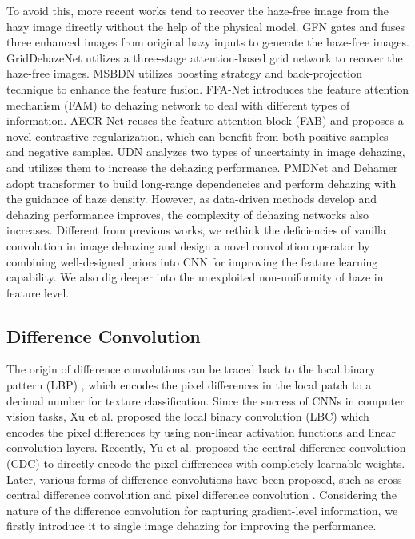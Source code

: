 \documentclass[lettersize,journal]{IEEEtran}
\begin{document}
{To avoid this, more recent works tend to recover the haze-free image from the hazy image directly without the help of the physical model. 
GFN \cite{ren2018CVPR} gates and fuses three enhanced images from original hazy inputs to generate the haze-free images. 
GridDehazeNet \cite{liu2019ICCV} utilizes a three-stage attention-based grid network to recover the haze-free images. 
MSBDN \cite{dong2020CVPR} utilizes boosting strategy and back-projection technique to enhance the feature fusion. 
FFA-Net \cite{qin2020AAAI} introduces the feature attention mechanism (FAM) to dehazing network to deal with different types of information. 
AECR-Net \cite{wu2021CVPR} reuses the feature attention block (FAB) \cite{qin2020AAAI} and proposes a novel contrastive regularization, which can benefit from both positive samples and negative samples. 
UDN \cite {hong2022AAAI} analyzes two types of uncertainty in image dehazing, and utilizes them to increase the dehazing performance. 
PMDNet \cite{ye2022ECCVORAL} and Dehamer \cite{guo2022CVPR} adopt transformer to build long-range dependencies and perform dehazing with the guidance of haze density. 
However, as data-driven methods develop and dehazing performance improves, the complexity of dehazing networks also increases. 
Different from previous works, we rethink the deficiencies of vanilla convolution in image dehazing and design a novel convolution operator by combining well-designed priors into CNN for improving the feature learning capability. 
We also dig deeper into the unexploited non-uniformity of haze in feature level. 


\subsection{Difference Convolution}
The origin of difference convolutions can be traced back to the local binary pattern (LBP) \cite{ojala2002TPAMI}, which encodes the pixel differences in the local patch to a decimal number for texture classification. 
Since the success of CNNs in computer vision tasks, Xu et al. \cite{juefei2017CVPR} proposed the local binary convolution (LBC) which encodes the pixel differences by using non-linear activation functions and linear convolution layers. 
Recently, Yu et al. \cite{yu2020CVPR} proposed the central difference convolution (CDC) to directly encode the pixel differences with completely learnable weights. 
Later, various forms of difference convolutions have been proposed, such as cross central difference convolution \cite{yu2021IJCAI} and pixel difference convolution \cite{su2021ICCV}. 
Considering the nature of the difference convolution for capturing gradient-level information, we firstly introduce it to single image dehazing for improving the performance. 
}
\end{document}

